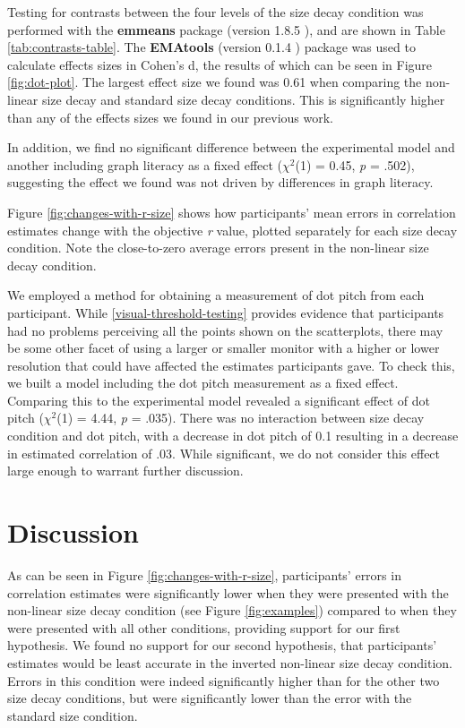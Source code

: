 \documentclass{vgtc}                          %
\begin{document}
Testing for contrasts between the four levels of the size decay condition
was performed with the \textbf{emmeans} package (version 1.8.5 \cite{emmeans}), and
are shown in Table \ref{tab:contrasts-table}. The \textbf{EMAtools} (version
0.1.4 \cite{ematools}) package was used to calculate effects sizes in Cohen's d, the results of which can be seen in Figure \ref{fig:dot-plot}. The largest effect size we found was 0.61 when comparing
the non-linear size decay and standard size decay conditions. This is significantly higher
than any of the effects sizes we found in our previous work.

In addition, we find no significant difference between the experimental model
and another including graph literacy as a fixed effect (\(\chi^2\)(1) = 0.45, \emph{p} = .502), suggesting the effect we found was not driven by differences in graph literacy.

Figure \ref{fig:changes-with-r-size} shows how participants' mean errors in correlation
estimates change with the objective \emph{r} value, plotted separately for each
size decay condition. Note the close-to-zero average errors present in the non-linear size
decay condition.

We employed a method for obtaining
a measurement of dot pitch from each participant. While \autoref{visual-threshold-testing}
provides evidence that participants had no problems perceiving all the points
shown on the scatterplots, there may be some other facet of using a larger or smaller
monitor with a higher or lower resolution that could have affected the estimates
participants gave. To check this, we built a model including the dot pitch
measurement as a fixed effect. Comparing this to the experimental model revealed
a significant effect of dot pitch (\(\chi^2\)(1) = 4.44, \emph{p} = .035). There was no interaction between size decay condition and dot pitch, with a decrease
in dot pitch of 0.1 resulting in a decrease in estimated correlation of .03. While
significant, we do not consider this effect large enough to warrant further discussion.

\hypertarget{discussion}{%
\section{Discussion}\label{discussion}}

As can be seen in Figure \ref{fig:changes-with-r-size},
participants' errors in correlation estimates were significantly lower when
they were presented with the non-linear size decay condition (see Figure \ref{fig:examples})
compared to when they were presented with all other conditions, providing support for our
first hypothesis. We found no support for our second hypothesis, that participants' estimates would be least accurate in the inverted non-linear size decay condition. Errors in this condition were indeed significantly higher than for the other
two size decay conditions, but were significantly lower than
the error with the standard size condition.
\end{document}
